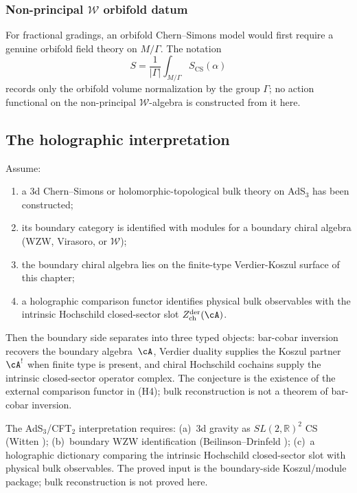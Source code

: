 \subsubsection{Non-principal \texorpdfstring{$\mathcal{W}$}{W} orbifold datum}

For fractional gradings, an orbifold Chern--Simons model would first
require a genuine orbifold field theory on $M/\Gamma$.  The notation
\[
S = \frac{1}{|\Gamma|} \int_{M/\Gamma} S_{\mathrm{CS}}(\alpha)
\]
records only the orbifold volume normalization by the group
$\Gamma$; no action functional on the non-principal
$\mathcal W$-algebra is constructed from it here.

\subsection{The holographic interpretation}

\begin{conjecture}
\label{conj:ads-cft-cs-koszul}
Assume:
\begin{enumerate}[label=\textup{(H\arabic*)}]
\item a $3$d Chern--Simons or holomorphic-topological bulk theory on
AdS$_3$ has been constructed;
\item its boundary category is identified with modules for a boundary
chiral algebra \textup{(}WZW, Virasoro, or $\mathcal W$\textup{)};
\item the boundary chiral algebra lies on the finite-type
Verdier-Koszul surface of this chapter;
\item a holographic comparison functor identifies physical bulk
observables with the intrinsic Hochschild closed-sector slot
$Z^{\mathrm{der}}_{\mathrm{ch}}(\cA)$.
\end{enumerate}
Then the boundary side separates into three typed objects:
bar-cobar inversion recovers the boundary algebra~$\cA$, Verdier
duality supplies the Koszul partner~$\cA^!$ when finite type is
present, and chiral Hochschild cochains supply the intrinsic
closed-sector operator complex.  The conjecture is the existence of the
external comparison functor in \textup{(H4)}; bulk reconstruction is
not a theorem of bar-cobar inversion.
\end{conjecture}

\begin{remark}[Scope]
The AdS$_3$/CFT$_2$ interpretation requires: (a)~3d gravity as
$SL(2,\mathbb{R})^2$ CS (Witten \cite{Wit89}); (b)~boundary WZW
identification (Beilinson--Drinfeld \cite{BD04}); (c)~a holographic
dictionary comparing the intrinsic Hochschild closed-sector slot with physical
bulk observables. The proved input is the boundary-side
Koszul/module package; bulk reconstruction is not proved here.
\end{remark}

